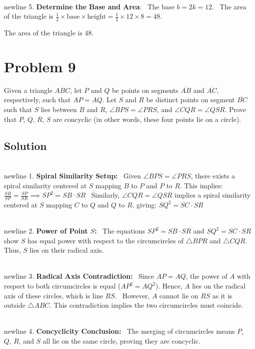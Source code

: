 \documentclass{article}
\begin{document}
\\newline 5. \textbf{Determine the Base and Area}:
\noindent \textbullet\ The base \(b = 2k = 12\).
\noindent \textbullet\ The area of the triangle is \(\frac{1}{2} \times \text{base} \times \text{height} = \frac{1}{2} \times 12 \times 8 = 48\).

The area of the triangle is \(\boxed{48}\).
\hrulefill
\newpage
\section*{Problem 9}
Given a triangle \(ABC\), let \(P\) and \(Q\) be points on segments \(\overline{AB}\) and \(\overline{AC}\), respectively, such that \(AP = AQ\).  Let \(S\) and \(R\) be distinct points on segment \(\overline{BC}\) such that \(S\) lies between \(B\) and \(R\), \(\angle{BPS} = \angle{PRS}\), and \(\angle{CQR} = \angle{QSR}\).  Prove that \(P\), \(Q\), \(R\), \(S\) are concyclic (in other words, these four points lie on a circle).

\subsection*{Solution}
\\newline 1. \textbf{Spiral Similarity Setup:}
\noindent \textbullet\ Given \(\angle BPS = \angle PRS\), there exists a spiral similarity centered at \(S\) mapping \(B\) to \(P\) and \(P\) to \(R\). This implies:
     \(
     \frac{SB}{SP} = \frac{SP}{SR} \implies SP^2 = SB \cdot SR
     \)
\noindent \textbullet\ Similarly, \(\angle CQR = \angle QSR\) implies a spiral similarity centered at \(S\) mapping \(C\) to \(Q\) and \(Q\) to \(R\), giving:
     \(
     SQ^2 = SC \cdot SR
     \)

\\newline 2. \textbf{Power of Point \(S\):}
\noindent \textbullet\ The equations \(SP^2 = SB \cdot SR\) and \(SQ^2 = SC \cdot SR\) show \(S\) has equal power with respect to the circumcircles of \(\triangle BPR\) and \(\triangle CQR\). Thus, \(S\) lies on their radical axis.

\\newline 3. \textbf{Radical Axis Contradiction:}
\noindent \textbullet\ Since \(AP = AQ\), the power of \(A\) with respect to both circumcircles is equal (\(AP^2 = AQ^2\)). Hence, \(A\) lies on the radical axis of these circles, which is line \(RS\).
\noindent \textbullet\ However, \(A\) cannot lie on \(RS\) as it is outside \(\triangle ABC\). This contradiction implies the two circumcircles must coincide.

\\newline 4. \textbf{Concyclicity Conclusion:}
\noindent \textbullet\ The merging of circumcircles means \(P\), \(Q\), \(R\), and \(S\) all lie on the same circle, proving they are concyclic.
\hrulefill
\newpage
\end{document}
